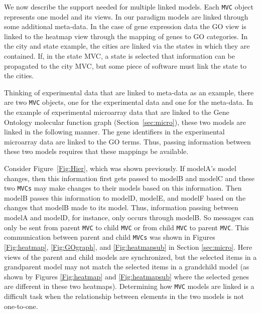 \documentclass[11pt]{article}
\newcommand{\Robject}[1]{{\texttt{#1}}}
\begin{document}

We now describe the support needed for multiple linked models.
Each \Robject{MVC} object represents one model and its views.  In our
paradigm models are linked through some additional meta-data. In
the case of gene expression data the GO view is linked to the heatmap
view through the mapping of genes to GO categories. In the city and
state example, the cities are linked via the states in which they are
contained. If, in the state MVC, a state is selected that information
can be propagated to the city MVC, but some piece of software must
link the state to the cities. %

Thinking of experimental data that are linked to meta-data as an
example, there are two \Robject{MVC} objects, one for the experimental
data and one for the meta-data.  In the example of experimental
microarray data that are linked to the Gene Ontology molecular
function graph (Section~\ref{sec:micro}), these two models are
linked in the following manner. The gene identifiers in the
experimental microarray data are linked to the GO terms.  Thus,
passing information between these two models requires that these
mappings be available.

Consider Figure~\ref{Fig:Hier}, which was shown previously.  If
modelA's model changes, then this information first gets passed to
modelB and modelC and these two \Robject{MVCs} may make changes to
their models based on this information.  Then modelB passes this
information to modelD, modelE, and modelF based on the changes
that modelB made to its model.  Thus, information passing between
modelA and modelD, for instance, only occurs through modelB.  So
messages can only be sent from parent \Robject{MVC} to child
\Robject{MVC} or from child \Robject{MVC} to parent \Robject{MVC}.
This communication between parent and child \Robject{MVCs} was shown in Figures
\ref{Fig:heatmap}, \ref{Fig:GOgraph}, and \ref{Fig:heatmapsub} in Section
\ref{sec:micro}.  Here views of the parent and child models are
synchronized, but the selected items in a grandparent model may not
match the selected items in a grandchild model (as shown by Figures
\ref{Fig:heatmap} and \ref{Fig:heatmapsub} where the selected genes are
different in these two heatmaps).  Determining how \Robject{MVC} models are
linked is a difficult task when the relationship between elements in the two
models is not one-to-one.
\end{document}
